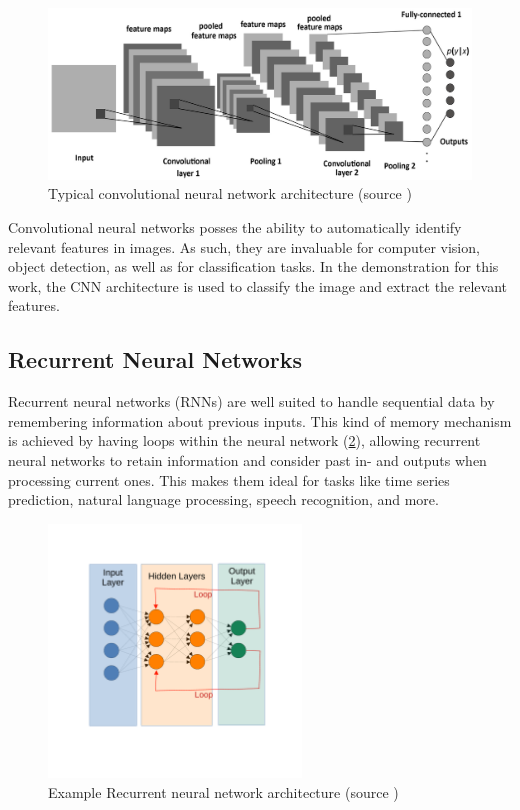 \documentclass[12pt, a4paper, titlepage]{report}
\begin{document}
\begin{figure}[h]
	\centering
	\includegraphics[width=1.0\textwidth]{../rc/images/cnn_architecture.png}
   \caption{Typical convolutional neural network architecture (source \cite{img_cnn_architecture})}
	\label{fig:cnn_architecture}
\end{figure}


Convolutional neural networks posses the ability to automatically identify relevant features in images. As such, they are invaluable for computer vision, object detection, as well as for classification tasks. In the demonstration for this work, the CNN architecture is used to classify the image and extract the relevant features.


\subsection{Recurrent Neural Networks}

Recurrent neural networks (RNNs) are well suited to handle sequential data by remembering information about previous inputs. This kind of memory mechanism is achieved by having loops within the neural network (\ref{fig:rnn_architecture}), allowing recurrent neural networks to retain information and consider past in- and outputs when processing current ones. This makes them ideal for tasks like time series prediction, natural language processing, speech recognition, and more.

\begin{figure}[h]
   \centering
	\includegraphics[width=0.6\textwidth]{../rc/images/rnn_architecture.pdf}
   \caption{Example Recurrent neural network architecture (source \cite{img_rnn_architecture})}
	\label{fig:rnn_architecture}
\end{figure}
\end{document}
